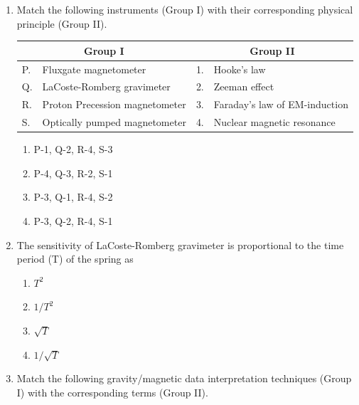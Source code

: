 \documentclass[journal,12pt,onecolumn]{IEEEtran}
\begin{document}
\begin{enumerate}
\item Match the following instruments (Group I) with their corresponding physical principle (Group II).

\hfill{}
\begin{center}
\begin{tabular}{ll|ll}
\multicolumn{2}{c}{\textbf{Group I}} & \multicolumn{2}{c}{\textbf{Group II}} \\
\hline
P. & Fluxgate magnetometer & 1. & Hooke's law \\
Q. & LaCoste-Romberg gravimeter & 2. & Zeeman effect \\
R. & Proton Precession magnetometer & 3. & Faraday's law of EM-induction \\
S. & Optically pumped magnetometer & 4. & Nuclear magnetic resonance \\
\end{tabular}
\end{center}
\begin{multicols}{2}
\begin{enumerate}
    \item P-1, Q-2, R-4, S-3
    \item P-4, Q-3, R-2, S-1
    \item P-3, Q-1, R-4, S-2
    \item P-3, Q-2, R-4, S-1
\end{enumerate}
\end{multicols}

\item The sensitivity of LaCoste-Romberg gravimeter is proportional to the time period (T) of the spring as

\hfill{}
\begin{multicols}{4}
\begin{enumerate}
    \item $T^2$
    \item $1/T^2$
    \item $\sqrt{T}$
    \item $1/\sqrt{T}$
\end{enumerate}
\end{multicols}

\item Match the following gravity/magnetic data interpretation techniques (Group I) with the corresponding terms (Group II).


\end{enumerate}
\end{document}
